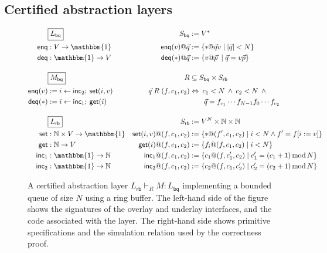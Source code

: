 \documentclass[sigplan,10pt,review,anonymous]{acmart}
\newcommand{\kw}[1]{\ensuremath{ \mathsf{#1} }}
\begin{document}


\subsection{Certified abstraction layers} %

\begin{figure*} %
  \begin{minipage}{.9\textwidth}
    \begin{align*}
      & \fbox{$L_\kw{bq}$} &
        S_\kw{bq} &:= V^* \\
      \kw{enq} &: V \rightarrow \mathbbm{1} &
        \kw{enq}(v)@\vec{q} &:= \{ * @ \vec{q} v \mid |\vec{q}| < N \} \\
      \kw{deq} &: \mathbbm{1} \rightarrow V &
        \kw{deq}(*)@\vec{q} &:= \{ v @ \vec{p} \: \mid \vec{q} = v \vec{p} \}
      \\[1em]
      & \fbox{$M_\kw{bq}$} &
        R &\subseteq S_\kw{bq} \times S_\kw{rb} \\
      \kw{enq}(v) &:= i \leftarrow \kw{inc}_2 ; \: \kw{set}(i, v) &
        \vec{q} \mathrel{R} (f, c_1, c_2) &\Leftrightarrow
        \: c_1 < N \:\wedge\: c_2 < N \:\wedge\: {}
      \\
      \kw{deq}(*) &:= i \leftarrow \kw{inc}_1 ; \: \kw{get}(i) &
        & \qquad \vec{q} = f_{c_1} \cdots f_{N-1} f_0 \cdots f_{c_2}
      \\[1em]
      & \fbox{$L_\kw{rb}$} &
        S_\kw{rb} &:= V^N \times \mathbb{N} \times \mathbb{N}
      \\
      \kw{set} &: \mathbb{N} \times V \rightarrow \mathbbm{1} &
        \kw{set}(i, v)@(f, c_1, c_2) &:=
        \{ *@(f', c_1, c_2) \mid i < N \wedge f' = f[i := v] \}
      \\
      \kw{get} &: \mathbb{N} \rightarrow V &
        \kw{get}(i)@(f, c_1, c_2) &:=
        \{ f_i@(f, c_1, c_2) \mid i < N \}
      \\
      \kw{inc}_1 &: \mathbbm{1} \rightarrow \mathbb{N} &
        \kw{inc}_1@(f, c_1, c_2) &:=
        \{ c_1@(f, c_1', c_2) \mid
           c_1' = (c_1 + 1) \mathop{\mathrm{mod}} N \}
      \\
      \kw{inc}_2 &: \mathbbm{1} \rightarrow \mathbb{N} &
        \kw{inc}_2@(f, c_1, c_2) &:=
        \{ c_2@(f, c_1, c_2') \mid
           c_2' = (c_2 + 1) \mathop{\mathrm{mod}} N \}
    \end{align*}
  \end{minipage}
  \caption{A certified abstraction layer
    $L_\kw{rb} \vdash_R M : L_\kw{bq}$
    implementing a bounded queue of size $N$
    using a ring buffer.
    The left-hand side of the figure shows
    the signatures of the overlay and underlay interfaces,
    and the code associated with the layer.
    The right-hand side shows primitive specifications
    and the simulation relation used by the correctness proof.}
  \label{fig:cal}
\end{figure*}
\end{document}
